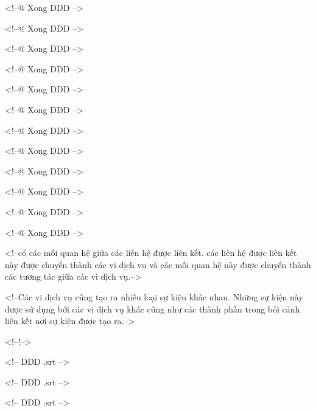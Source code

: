 <!--@ Xong DDD -->

<!--@ Xong DDD -->

<!--@ Xong DDD -->

<!--@ Xong DDD -->

<!--@ Xong DDD -->

<!--@ Xong DDD -->

<!--@ Xong DDD -->

<!--@ Xong DDD -->

<!--@ Xong DDD -->

<!--@ Xong DDD -->

<!--@ Xong DDD -->

<!--@ Xong DDD -->

<!--có các mối quan hệ giữa các liên hệ được liên kết. các liên hệ được liên kết này được chuyển thành các vi dịch vụ và các mối quan hệ này được chuyển thành các tương tác giữa các vi dịch vụ.-->

<!--Các vi dịch vụ cũng tạo ra nhiều loại sự kiện khác nhau. Những sự kiện này được sử dụng bởi các vi dịch vụ khác cũng như các thành phần trong bối cảnh liên kết nơi sự kiện được tạo ra.-->

<!--!-->

<!-- DDD .srt -->

<!-- DDD .srt -->

<!-- DDD .srt -->
